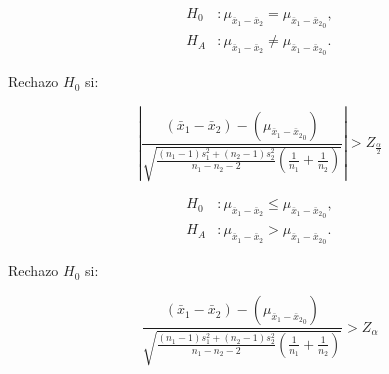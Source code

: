     

\begin{minipage}[c]{\textwidth}
    \begin{minipage}[c]{0.3 \textwidth}\item
    	\begin{align*}
    	H_0&: \mu _{ \bar { x } _{ 1 }-\bar { x } _{ 2 }} = \mu _{ \bar { x } _{ 1 }-\bar { x } _{ 2 }}_0,\\
    	H_A&: \mu _{ \bar { x } _{ 1 }-\bar { x } _{ 2 }} \neq \mu _{ \bar { x } _{ 1 }-\bar { x } _{ 2 }}_0.    	
    	\end{align*}\end{minipage} \hfill
    \begin{minipage}[b]{0.3 \textwidth}\item
				Rechazo	$H_0$ si:		
		\end{minipage} \hfill
    \begin{minipage}[c]{0.3 \textwidth}\item
	 $$\left|\frac { (\bar { x } _{ 1 }-\bar { x } _{ 2 })-(\mu _{ \bar { x } _{ 1 }-\bar { x } _{ 2 } }_{ 0 }) }{ \sqrt { \frac { (n_{ 1 }-1)s^{ 2 }_{ 1 }+(n_{ 2 }-1)s^{ 2 }_{ 2 } }{ n_{ 1 }-n_{ 2 }-2 }   \left( \frac { 1 }{ n_{ 1 } } +\frac { 1 }{ n_{ 2 } }  \right)  } }\right|> Z_{\frac{\alpha}{2}}$$
    \end{minipage}
    \end{minipage}
    
    
	\begin{minipage}[c]{\textwidth}
    \begin{minipage}[c]{0.3 \textwidth}\item
    	\begin{align*}
    	H_0&: \mu _{ \bar { x } _{ 1 }-\bar { x } _{ 2 }} \le \mu _{ \bar { x } _{ 1 }-\bar { x } _{ 2 }}_0,\\
    	H_A&: \mu _{ \bar { x } _{ 1 }-\bar { x } _{ 2 }} > \mu _{ \bar { x } _{ 1 }-\bar { x } _{ 2 }}_0.    	
    	\end{align*}\end{minipage} \hfill
    \begin{minipage}[b]{0.3 \textwidth}\item
				Rechazo $H_0$ si:		
		\end{minipage} \hfill
    \begin{minipage}[c]{0.3 \textwidth}\item
	 $$\frac { (\bar { x } _{ 1 }-\bar { x } _{ 2 })-(\mu _{ \bar { x } _{ 1 }-\bar { x } _{ 2 } }_{ 0 }) }{ \sqrt { \frac { (n_{ 1 }-1)s^{ 2 }_{ 1 }+(n_{ 2 }-1)s^{ 2 }_{ 2 } }{ n_{ 1 }-n_{ 2 }-2 }   \left( \frac { 1 }{ n_{ 1 } } +\frac { 1 }{ n_{ 2 } }  \right)  } }> Z_{\alpha}$$
    \end{minipage}
    \end{minipage}
    
